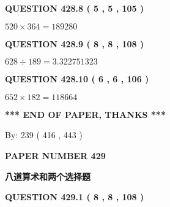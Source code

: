 \documentclass{ctexart}
\begin{document}
{\textbf{\Large{QUESTION
428.8 
 ( 5 , 5 , 105 )
}}}
  
  
 
 

$ %
520 \times  %
364=   %
189280$
 
 
  
\vspace{0.2in}
  
{\textbf{\Large{QUESTION
428.9 
 ( 8 , 8 , 108 )
}}}
  
  
 
 

$ %
628 \div  %
189=   %
3.322751323$
 
 
  
\vspace{0.2in}
  
{\textbf{\Large{QUESTION
428.10 
 ( 6 , 6 , 106 )
}}}
  
  
 
 

$ %
652 \times  %
182=   %
118664$
 
 
   
   
 \vspace{0.2in}
 
   
   
   
   
\vspace{1.0in} 
{\textbf{\large{ *** END OF PAPER, THANKS *** }}} 
   
   
\hspace{1.0in} By: 
 239 ( 416 ,  443 )
   
   
   
   
\newpage 
\setcounter{page}{ 
   429001 } 
   
   
   
   
 {\textbf{ \Large{ PAPER NUMBER  429  }}}
   
   
\vspace{0.2in}
   
   
   
   
   
   
 \vspace{0.2in}
{\LARGE {\textbf{ 八道算术和两个选择题}}}
   
   
  
\vspace{0.2in}
  
{\textbf{\Large{QUESTION
429.1 
 ( 8 , 8 , 108 )
}}}
  
\end{document}
